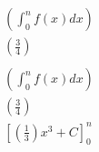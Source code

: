 \begin{align*}
  (\int_0^nf(x)dx) \\
  (\frac{3}{4}) \\ \\
  \left(\int_0^n
    f\left(x\right)dx\right) \\
  \left(\frac{3}{4}\right) \\
  \left[\left(\frac{1}{3}\right)
    x^3+C\right]_0^n
\end{align*}
